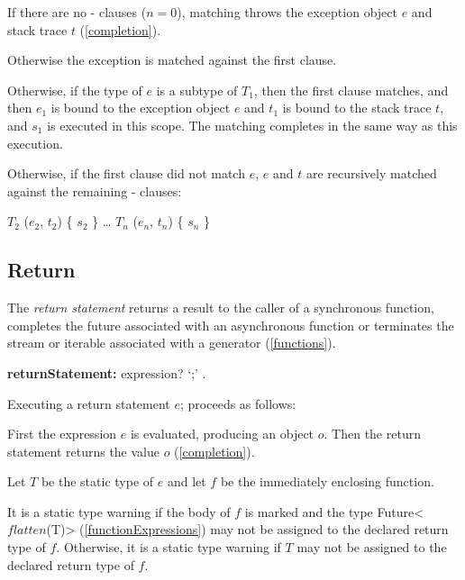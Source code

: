 \documentclass{article}
\newcommand{\code}[1]{{\sf #1}}
\begin{document}
\LMHash{}
If there are no \ON{}-\CATCH{} clauses ($n = 0$), matching throws the exception object $e$ and stack trace $t$ (\ref{completion}).

\LMHash{}
Otherwise the exception is matched against the first clause.

\LMHash{}
Otherwise, if the type of $e$ is a subtype of $T_1$, then the first clause matches, and then $e_1$ is bound to the exception object $e$ and $t_1$ is bound to the stack trace $t$, and $s_1$ is executed in this scope.
The matching completes in the same way as this execution.

\LMHash{}
Otherwise, if the first clause did not match $e$, $e$ and $t$ are recursively matched against the remaining \ON{}-\CATCH{} clauses:
\begin{dartCode}
\ON{} $T_2$ \CATCH{} ($e_2$, $t_2$) \{ $s_2$ \}
\ldots
\ON{} $T_n$ \CATCH{} ($e_n$, $t_n$) \{ $s_n$ \}
\end{dartCode}


\subsection{ Return}

\LMHash{}
The {\em return statement} returns a result to the caller of a synchronous function, completes the future associated with an asynchronous function or terminates the stream or iterable associated with a generator (\ref{functions}).


 \begin{grammar}
{\bf returnStatement:}
    \RETURN{} expression? `{\escapegrammar ;}' %
    .
 \end{grammar}

\LMHash{}
Executing a return statement \code{\RETURN{} $e$;} proceeds as follows:

\LMHash{}
First the expression $e$ is evaluated, producing an object $o$.
Then the return statement returns the value $o$ (\ref{completion}).

\LMHash{}
Let $T$ be the static type of $e$ and let $f$ be the immediately enclosing function.

\LMHash{}
It is a static type warning if the body of $f$ is marked \ASYNC{} and the type \code{Future<$flatten$(T)>} (\ref{functionExpressions}) may not be assigned to the declared return type of $f$.    Otherwise, it is a static type warning if $T$ may not be assigned to the declared return type of $f$.
\end{document}
